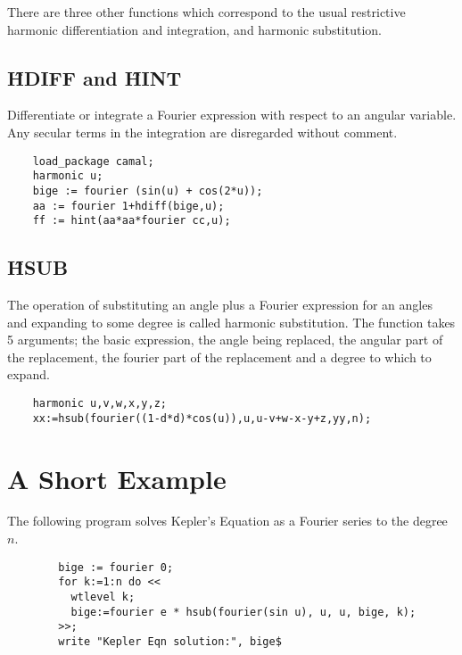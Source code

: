 There are three other functions which correspond to the usual
restrictive harmonic differentiation and integration, and harmonic
substitution.

\subsection*{\f{HDIFF} and \f{HINT}}

Differentiate or integrate a Fourier expression with respect to an angular
variable.  Any secular terms in the integration are disregarded without
comment.
\begin{verbatim}
    load_package camal;
    harmonic u;
    bige := fourier (sin(u) + cos(2*u));
    aa := fourier 1+hdiff(bige,u); 
    ff := hint(aa*aa*fourier cc,u);
\end{verbatim}

\subsection*{\f{HSUB}}

The operation of substituting an angle plus a Fourier expression for
an angles and expanding to some degree is called harmonic substitution.
The function takes 5 arguments; the basic expression, the angle being
replaced, the angular part of the replacement, the fourier part of the
replacement and a degree to which to expand.
\begin{verbatim}
    harmonic u,v,w,x,y,z;
    xx:=hsub(fourier((1-d*d)*cos(u)),u,u-v+w-x-y+z,yy,n);
\end{verbatim}

\section{A Short Example}

The following program solves Kepler's Equation as a Fourier series to
the degree $n$.

\begin{verbatim}
        bige := fourier 0;
        for k:=1:n do <<
          wtlevel k;
          bige:=fourier e * hsub(fourier(sin u), u, u, bige, k);
        >>;
        write "Kepler Eqn solution:", bige$
\end{verbatim}

